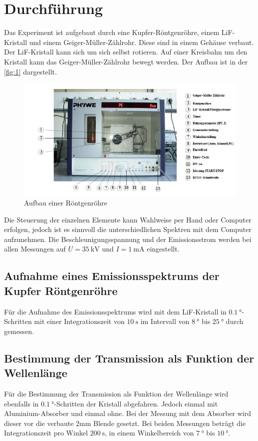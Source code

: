 \section{Durchführung}
Das Experiment ist aufgebaut durch eine Kupfer-Röntgenröhre, einem LiF-Kristall und einem Geiger-Müller-Zählrohr. Diese sind in einem Gehäuse verbaut. Der LiF-Kristall kann sich um sich 
selbst rotieren. Auf einer Kreisbahn um den Kristall kann das Geiger-Müller-Zählrohr bewegt werden. Der Aufbau ist in der \autoref{fig:1} dargestellt.
\begin{figure}[H]
    \centering
    \includegraphics[width=\linewidth]{Bilder/kasten.jpg}
    \caption{Aufbau einer Röntgenröhre \cite{V603}}
    \label{fig:1}
\end{figure}
Die Steuerung der einzelnen Elemente kann Wahlweise per Hand oder Computer erfolgen, jedoch ist es sinnvoll die unterschiedlichen Spektren mit dem Computer aufzunehmen. Die Beschleunigungsspannung
und der Emissionsstrom werden bei allen Messungen auf $U = \SI{35}{\kilo\volt}$ und $I = \SI{1}{\milli\ampere}$ eingestellt.

\subsection{Aufnahme eines Emissionsspektrums der Kupfer Röntgenröhre}
Für die Aufnahme des Emissionsspektrums wird mit dem LiF-Kristall in $\SI{0.1}{\degree}$-Schritten mit einer Integrationszeit von $\SI{10}{\second}$ im Intervall von 
$\SI{8}{\degree}$ bis $\SI{25}{\degree}$ durch gemessen. 

\subsection{Bestimmung der Transmission als Funktion der Wellenlänge}
Für die Bestimmung der Transmission als Funktion der Wellenlänge wird ebenfalls in $\SI{0.1}{\degree}$-Schritten der Kristall abgefahren. Jedoch einmal mit Aluminium-Absorber und einmal ohne.
Bei der Messung mit dem Absorber wird dieser vor die verbaute 2mm Blende gesetzt. Bei beiden Messungen beträgt die Integrationszeit pro Winkel $\SI{200}{\second}$, in einem Winkelbereich von 
$\SI{7}{\degree}$ bis $\SI{10}{\degree}$.

